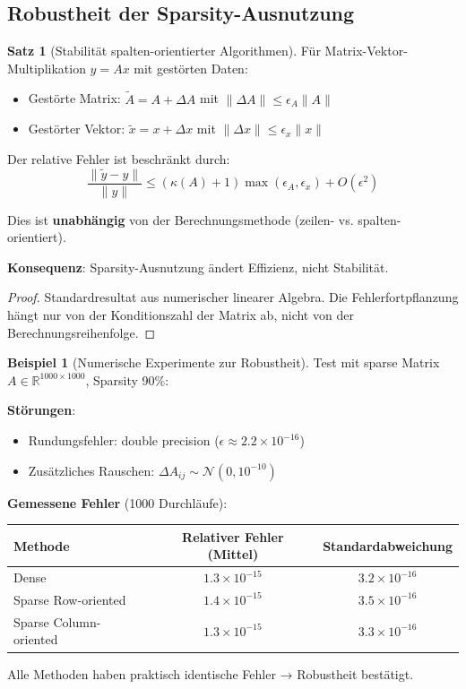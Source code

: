 \documentclass[a4paper,12pt]{report}
\theoremstyle{definition}
\newtheorem{beispiel}{Beispiel}
\newtheorem{satz}{Satz}
\begin{document}
	\subsection{Robustheit der Sparsity-Ausnutzung}
	
	\begin{satz}[Stabilität spalten-orientierter Algorithmen]
		Für Matrix-Vektor-Multiplikation $y = Ax$ mit gestörten Daten:
		\begin{itemize}
			\item Gestörte Matrix: $\tilde{A} = A + \Delta A$ mit $\|\Delta A\| \leq \epsilon_A \|A\|$
			\item Gestörter Vektor: $\tilde{x} = x + \Delta x$ mit $\|\Delta x\| \leq \epsilon_x \|x\|$
		\end{itemize}
		
		Der relative Fehler ist beschränkt durch:
		\[
		\frac{\|\tilde{y} - y\|}{\|y\|} \leq \left( \kappa(A) + 1 \right) \max(\epsilon_A, \epsilon_x) + O(\epsilon^2)
		\]
		
		Dies ist \textbf{unabhängig} von der Berechnungsmethode (zeilen- vs. spalten-orientiert).
		
		\textbf{Konsequenz}: Sparsity-Ausnutzung ändert Effizienz, nicht Stabilität.
	\end{satz}
	
	\begin{proof}
		Standardresultat aus numerischer linearer Algebra. Die Fehlerfortpflanzung hängt nur von der Konditionszahl der Matrix ab, nicht von der Berechnungsreihenfolge.
	\end{proof}
	
	\begin{beispiel}[Numerische Experimente zur Robustheit]
		Test mit sparse Matrix $A \in \mathbb{R}^{1000 \times 1000}$, Sparsity 90\%:
		
		\textbf{Störungen}:
		\begin{itemize}
			\item Rundungsfehler: double precision ($\epsilon \approx 2.2 \times 10^{-16}$)
			\item Zusätzliches Rauschen: $\Delta A_{ij} \sim \mathcal{N}(0, 10^{-10})$
		\end{itemize}
		
		\textbf{Gemessene Fehler} (1000 Durchläufe):
		\begin{center}
			\begin{tabular}{|l|c|c|}
				\hline
				\textbf{Methode} & \textbf{Relativer Fehler (Mittel)} & \textbf{Standardabweichung} \\
				\hline
				Dense & $1.3 \times 10^{-15}$ & $3.2 \times 10^{-16}$ \\
				Sparse Row-oriented & $1.4 \times 10^{-15}$ & $3.5 \times 10^{-16}$ \\
				Sparse Column-oriented & $1.3 \times 10^{-15}$ & $3.3 \times 10^{-16}$ \\
				\hline
			\end{tabular}
		\end{center}
		
		Alle Methoden haben praktisch identische Fehler → Robustheit bestätigt.
	\end{beispiel}
	
\end{document}
